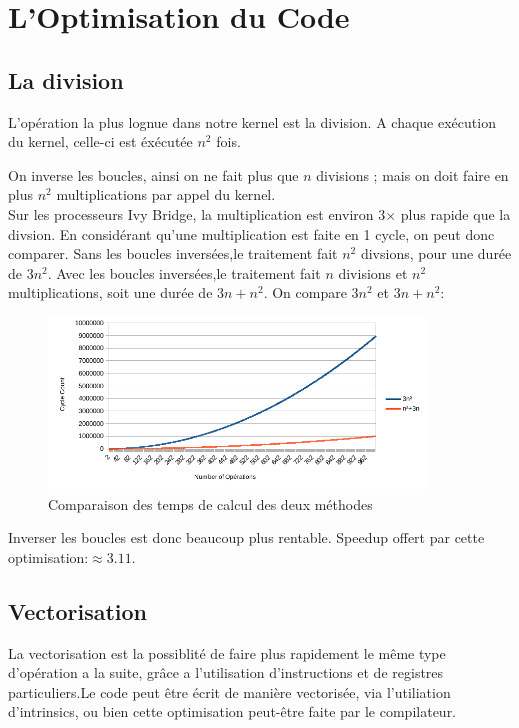 
\chapter*{L'Optimisation du Code}
\section*{La division}

L'opération la plus lognue dans notre kernel est la division. A chaque exécution du kernel, celle-ci est éxécutée $n^2$ fois.

On inverse les boucles, ainsi on ne fait plus que $n$ divisions ; mais on doit faire en plus $n^2$ multiplications par appel du kernel.
\\Sur les processeurs Ivy Bridge, la multiplication est environ 3$\times$ plus rapide que la divsion. En considérant qu'une multiplication est faite en 1 cycle, on peut donc comparer.
Sans les boucles inversées,le traitement fait $n^2$ divsions, pour une durée de $3n^2$.
Avec les boucles inversées,le traitement fait $n$ divisions et $n^2$ multiplications, soit une durée de $3n+n^2$.
On compare $3n^2$ et $3n+n^2$:\\
\begin{figure}[ht!]
    \centering
    \includegraphics[width=100mm]{MEDIA/div_vs_mult_graph.png}
    \caption{Comparaison des temps de calcul des deux méthodes}
\end{figure}
Inverser les boucles est donc beaucoup plus rentable.
Speedup offert par cette optimisation:$\approx 3.11$.

\section*{Vectorisation}

La vectorisation est la possiblité de faire plus rapidement le même type d'opération a la suite, grâce a l'utilisation d'instructions et de registres particuliers.Le code peut être écrit de manière vectorisée, via l'utiliation d'intrinsics, ou bien cette optimisation peut-être faite par le compilateur.

